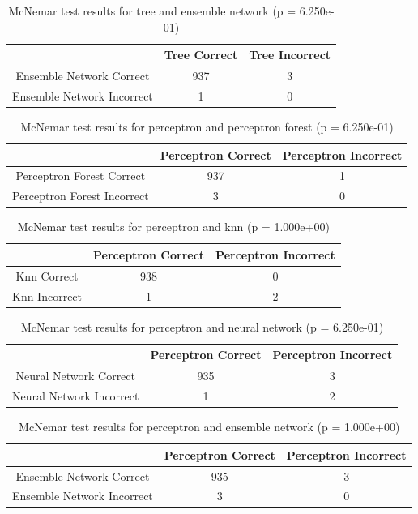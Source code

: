 \documentclass[paper=a4, fontsize=11pt]{scrartcl} %
\begin{document}
\begin{appendices}
\begin{table}[H]
	\centering
	\caption{McNemar test results for tree and ensemble network (p = 6.250e-01)}
	\begin{tabular}{|c||c|c|}
		\hline
		& Tree Correct & Tree Incorrect \\ \hline \hline
		Ensemble Network Correct & 937 & 3 \\ \hline
		Ensemble Network Incorrect& 1 & 0 \\ \hline
	\end{tabular}
\end{table}

\begin{table}[H]
	\centering
	\caption{McNemar test results for perceptron and perceptron forest (p = 6.250e-01)}
	\begin{tabular}{|c||c|c|}
		\hline
		& Perceptron Correct & Perceptron Incorrect \\ \hline \hline
		Perceptron Forest Correct & 937 & 1 \\ \hline
		Perceptron Forest Incorrect& 3 & 0 \\ \hline
	\end{tabular}
\end{table}

\begin{table}[H]
	\centering
	\caption{McNemar test results for perceptron and knn (p = 1.000e+00)}
	\begin{tabular}{|c||c|c|}
		\hline
		& Perceptron Correct & Perceptron Incorrect \\ \hline \hline
		Knn Correct & 938 & 0 \\ \hline
		Knn Incorrect& 1 & 2 \\ \hline
	\end{tabular}
\end{table}

\begin{table}[H]
	\centering
	\caption{McNemar test results for perceptron and neural network (p = 6.250e-01)}
	\begin{tabular}{|c||c|c|}
		\hline
		& Perceptron Correct & Perceptron Incorrect \\ \hline \hline
		Neural Network Correct & 935 & 3 \\ \hline
		Neural Network Incorrect& 1 & 2 \\ \hline
	\end{tabular}
\end{table}

\begin{table}[H]
	\centering
	\caption{McNemar test results for perceptron and ensemble network (p = 1.000e+00)}
	\begin{tabular}{|c||c|c|}
		\hline
		& Perceptron Correct & Perceptron Incorrect \\ \hline \hline
		Ensemble Network Correct & 935 & 3 \\ \hline
		Ensemble Network Incorrect& 3 & 0 \\ \hline
	\end{tabular}
\end{table}


\end{appendices}
\end{document}
